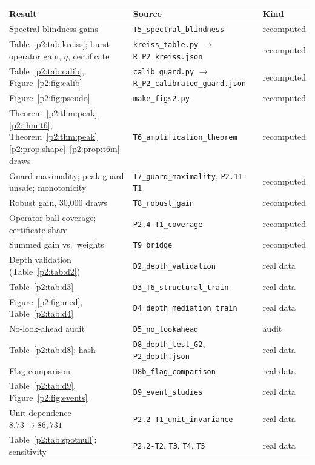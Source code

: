 \begin{longtable}{p{}p{}p{}}
\toprule
Result & Source & Kind\\
\midrule
\endhead
Spectral blindness gains & \texttt{T5\_spectral\_blindness} & recomputed\\
Table~\ref{p2:tab:kreiss}; burst operator gain, $q$, certificate & \texttt{kreiss\_table.py} $\to$ \texttt{R\_P2\_kreiss.json} & recomputed\\
Table~\ref{p2:tab:calib}, Figure~\ref{p2:fig:calib} & \texttt{calib\_guard.py} $\to$ \texttt{R\_P2\_calibrated\_guard.json} & recomputed\\
Figure~\ref{p2:fig:pseudo} & \texttt{make\_figs2.py} & recomputed\\
Theorem~\ref{p2:thm:peak}\ref{p2:thm:t6}, Theorem~\ref{p2:thm:peak}\ref{p2:prop:shape}--\ref{p2:prop:t6m} draws & \texttt{T6\_amplification\_theorem} & recomputed\\
Guard maximality; peak guard unsafe; monotonicity & \texttt{T7\_guard\_maximality}, \texttt{P2.11-T1} & recomputed\\
Robust gain, 30,000 draws & \texttt{T8\_robust\_gain} & recomputed\\
Operator ball coverage; certificate share & \texttt{P2.4-T1\_coverage} & recomputed\\
Summed gain vs.\ weights & \texttt{T9\_bridge} & recomputed\\
Depth validation (Table~\ref{p2:tab:d2}) & \texttt{D2\_depth\_validation} & real data\\
Table~\ref{p2:tab:d3} & \texttt{D3\_T6\_structural\_train} & real data\\
Figure~\ref{p2:fig:med}, Table~\ref{p2:tab:d4} & \texttt{D4\_depth\_mediation\_train} & real data\\
No-look-ahead audit & \texttt{D5\_no\_lookahead} & audit\\
Table~\ref{p2:tab:d8}; hash & \texttt{D8\_depth\_test\_G2}, \texttt{P2\_depth.json} & real data\\
Flag comparison & \texttt{D8b\_flag\_comparison} & real data\\
Table~\ref{p2:tab:d9}, Figure~\ref{p2:fig:events} & \texttt{D9\_event\_studies} & real data\\
Unit dependence $8.73\to86{,}731$ & \texttt{P2.2-T1\_unit\_invariance} & real data\\
Table~\ref{p2:tab:spotnull}; sensitivity & \texttt{P2.2-T2}, \texttt{T3}, \texttt{T4}, \texttt{T5} & real data\\

\end{longtable}
